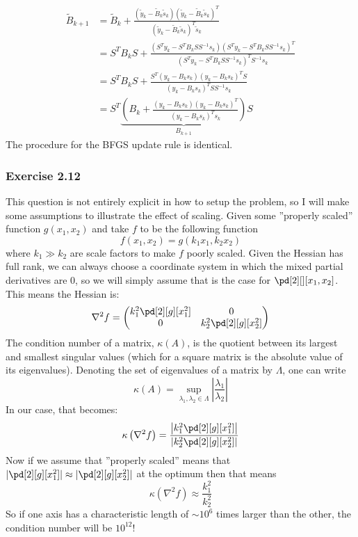 \begin{align*}
    \tilde{B}_{k+1} & = \tilde{B}_k + \frac{(\tilde{y}_k - \tilde{B}_k \tilde{s}_k)(\tilde{y}_k - \tilde{B}_k \tilde{s}_k)^{T}}
    {(\tilde{y}_k - \tilde{B}_k \tilde{s}_k)^{T} \tilde{s}_k}                                                                   \\
                    & = S^TB_kS + \frac{(S^Ty_k - S^T B_k S S^{-1} s_k)(S^Ty_k - S^TB_kS S^{-1} s_k)^{T}}
    {(S^Ty_k - S^TB_kSS^{-1} s_k)^{T} S^{-1} s_k}                                                                               \\
                    & = S^TB_kS + \frac{S^T(y_k -  B_k s_k)(y_k - B_ks_k)^{T}S}
    {(y_k - B_k s_k)^{T} S S^{-1} s_k}                                                                                          \\
                    & = S^T\underbrace{\left(B_k + \frac{(y_k -  B_k s_k)(y_k - B_ks_k)^{T}}
        {(y_k - B_k s_k)^{T}  s_k}\right)}_{B_{k+1}}S
\end{align*}
The procedure for the BFGS update rule is identical.\hfill\sq
\subsubsection{Exercise 2.12}
This question is not entirely explicit in how to setup the problem, so I will make some assumptions to illustrate the effect of scaling.
Given some ''properly scaled'' function $g(x_1, x_2)$ and take $f$ to be the following function
\[
    f(x_1,x_2) = g(k_1x_1, k_2x_2)
\]
where $k_1 \gg k_2$ are scale factors to make $f$ poorly scaled.
Given the Hessian has full rank, we can always choose a coordinate system in which the mixed partial derivatives are 0, so we will simply assume that is the case for $\pd[2][][x_1,x_2]$.
This means the Hessian is:
\[
    \nabla^2f = \begin{pmatrix}
        k_1^2\pd[2][g][x_1^2] & 0                     \\
        0                     & k_2^2\pd[2][g][x_2^2]
    \end{pmatrix}
\]
The condition number of a matrix, $\kappa(A)$, is the quotient between its largest and smallest singular values (which for a square matrix is the absolute value of its eigenvalues).
Denoting the set of eigenvalues of a matrix by $\Lambda$, one can write
\[
    \kappa(A) = \underset{\lambda_1, \lambda_2 \in \Lambda}{\operatorname{sup}}\left|\frac{\lambda_1}{\lambda_2}\right|
\]
In our case, that becomes:
\[
    \kappa \left( \nabla^2 f \right) = \frac{\left|k_1^2\pd[2][g][x_1^2]\right|}{\left|k_2^2\pd[2][g][x_2^2]\right|}
\]
Now if we assume that ''properly scaled'' means that $|\pd[2][g][x_1^2]| \approx |\pd[2][g][x_2^2]|$ at the optimum then that means
\[
    \kappa \left( \nabla^2 f \right) \approx \frac{k^2_1}{k_2^2}
\]
So if one axis has a characteristic length of $\sim 10^6$ times larger than the other, the condition number will be $10^{12}$!